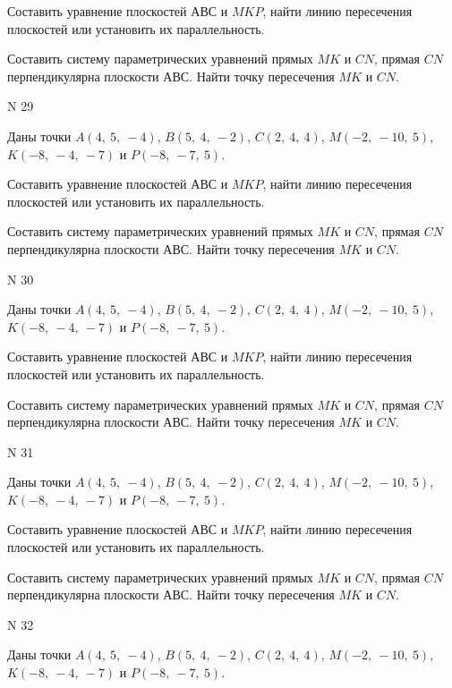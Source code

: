 \documentclass[11pt]{report}
\begin{document}
Составить уравнение плоскостей $АВС$ и $MKP$,
найти линию пересечения плоскостей или установить их параллельность.

Составить систему параметрических уравнений прямых $MK$ и $CN$,
прямая $CN$ перпендикулярна плоскости $АВС$. 
Найти точку пересечения $MK$ и $CN$.



 N 29

Даны точки $A\left( 4, \  5, \  -4\right)$, $B\left( 5, \  4, \  -2\right)$, $C\left( 2, \  4, \  4\right)$, $M\left( -2, \  -10, \  5\right)$, $K\left( -8, \  -4, \  -7\right)$ и $P\left( -8, \  -7, \  5\right)$.


Составить уравнение плоскостей $АВС$ и $MKP$,
найти линию пересечения плоскостей или установить их параллельность.

Составить систему параметрических уравнений прямых $MK$ и $CN$,
прямая $CN$ перпендикулярна плоскости $АВС$. 
Найти точку пересечения $MK$ и $CN$.



 N 30

Даны точки $A\left( 4, \  5, \  -4\right)$, $B\left( 5, \  4, \  -2\right)$, $C\left( 2, \  4, \  4\right)$, $M\left( -2, \  -10, \  5\right)$, $K\left( -8, \  -4, \  -7\right)$ и $P\left( -8, \  -7, \  5\right)$.


Составить уравнение плоскостей $АВС$ и $MKP$,
найти линию пересечения плоскостей или установить их параллельность.

Составить систему параметрических уравнений прямых $MK$ и $CN$,
прямая $CN$ перпендикулярна плоскости $АВС$. 
Найти точку пересечения $MK$ и $CN$.



 N 31

Даны точки $A\left( 4, \  5, \  -4\right)$, $B\left( 5, \  4, \  -2\right)$, $C\left( 2, \  4, \  4\right)$, $M\left( -2, \  -10, \  5\right)$, $K\left( -8, \  -4, \  -7\right)$ и $P\left( -8, \  -7, \  5\right)$.


Составить уравнение плоскостей $АВС$ и $MKP$,
найти линию пересечения плоскостей или установить их параллельность.

Составить систему параметрических уравнений прямых $MK$ и $CN$,
прямая $CN$ перпендикулярна плоскости $АВС$. 
Найти точку пересечения $MK$ и $CN$.



 N 32

Даны точки $A\left( 4, \  5, \  -4\right)$, $B\left( 5, \  4, \  -2\right)$, $C\left( 2, \  4, \  4\right)$, $M\left( -2, \  -10, \  5\right)$, $K\left( -8, \  -4, \  -7\right)$ и $P\left( -8, \  -7, \  5\right)$.
\end{document}
